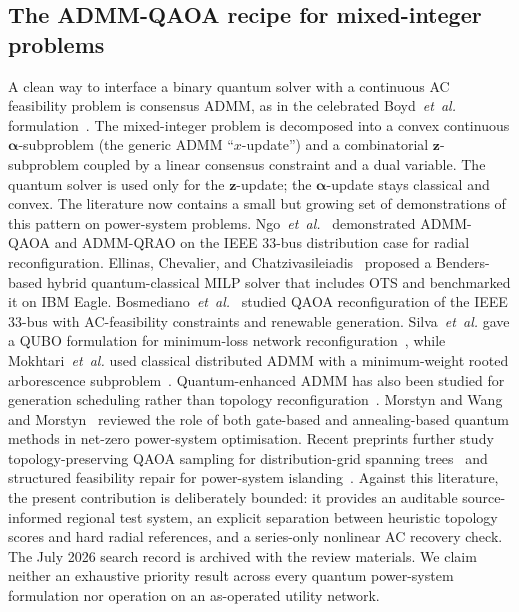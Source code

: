 \documentclass[5p,twocolumn,number,sort&compress,nopreprintline]{elsarticle}
\begin{document}
\subsection{The ADMM-QAOA recipe for mixed-integer problems}
A clean way to interface a binary quantum solver with a continuous AC
feasibility problem is consensus ADMM, as in the celebrated
Boyd~\emph{et~al.} formulation~\cite{boyd2011admm}. The
mixed-integer problem is decomposed into a convex continuous
$\boldsymbol\alpha$-subproblem (the generic ADMM ``$x$-update'') and a
combinatorial $\boldsymbol z$-subproblem coupled by a linear consensus
constraint and a dual variable. The quantum solver is used only for the
$\boldsymbol z$-update; the $\boldsymbol\alpha$-update stays
classical and convex. The literature now contains a small but growing
set of demonstrations of this pattern on power-system problems.
Ngo~\emph{et~al.}~\cite{ngo2022evaluate,ngo2024qrao} demonstrated
ADMM-QAOA and ADMM-QRAO on the IEEE 33-bus distribution case for
radial reconfiguration. Ellinas, Chevalier, and
Chatzivasileiadis~\cite{ellinas2024hybrid} proposed a Benders-based
hybrid quantum-classical MILP solver that includes OTS and benchmarked
it on IBM Eagle. Bosmediano~\emph{et~al.}~\cite{bosmediano2026dnr}
studied QAOA reconfiguration of the IEEE 33-bus with AC-feasibility
constraints and renewable generation. Silva~\emph{et~al.}
gave a QUBO formulation for minimum-loss network
reconfiguration~\cite{silva2021qubo}, while Mokhtari~\emph{et~al.}
used classical distributed ADMM with a minimum-weight rooted
arborescence subproblem~\cite{mokhtari2025admm}. Quantum-enhanced ADMM
has also been studied for generation scheduling rather than topology
reconfiguration~\cite{yang2026qreadmm}. Morstyn and
Wang~\cite{morstyn2024joule} and
Morstyn~\cite{morstyn2023annealing} reviewed the role of both gate-based
and annealing-based quantum methods in net-zero power-system
optimisation. Recent preprints further study topology-preserving QAOA
sampling for distribution-grid spanning trees~\cite{hartmann2025spanning}
and structured feasibility repair for power-system
islanding~\cite{jiang2026regrid}. Against this literature, the present contribution is
deliberately bounded: it provides an auditable source-informed regional
test system, an explicit separation between heuristic topology scores
and hard radial references, and a series-only nonlinear AC recovery
check. The July 2026 search record is archived with the review
materials. We claim neither an exhaustive priority result across every
quantum power-system formulation nor operation on an as-operated utility
network.
\end{document}
